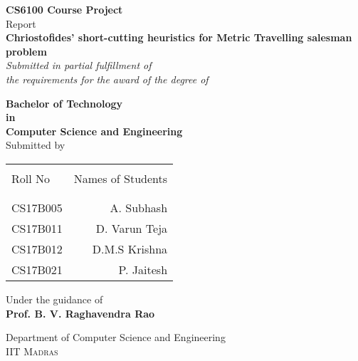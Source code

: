 \begin{titlepage}

       \begin{center}
       
       \textup{\small {\bf CS6100 Course Project} \\ Report}\\[0.2in]
       
       \Large \textbf {Chriostofides' short-cutting heuristics for Metric Travelling salesman problem}\\[0.5in]
       
              \small \emph{Submitted in partial fulfillment of\\
               the requirements for the award of the degree of}
               \vspace{.2in}
       
              {\bf Bachelor of Technology \\in\\ Computer Science and Engineering}\\[0.5in]
       
       \normalsize Submitted by \\
       \begin{table}[h]
       \centering
       \begin{tabular}{lr}\hline \\
       Roll No & Names of Students \\ \\ \hline
       \\
       CS17B005 & A. Subhash \\
       CS17B011 &  D. Varun Teja\\
       CS17B012 &  D.M.S Krishna\\
       CS17B021 &  P. Jaitesh\\\hline 
       \end{tabular}
       \end{table}
       
       \vspace{.1in}
       Under the guidance of\\
       {\textbf{Prof. B. V. Raghavendra Rao}}\\[0.2in]
       
       \vfill
       
       \Large{Department of Computer Science and Engineering}\\
       \normalsize
       \textsc{IIT Madras}\\
       
       \end{center}
       
       \end{titlepage}
       
